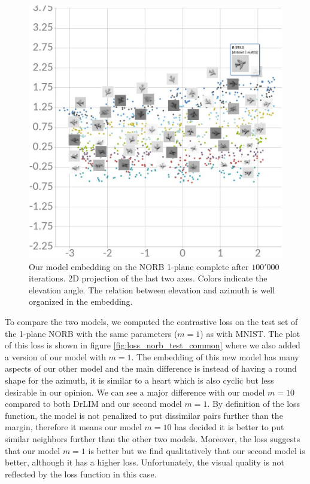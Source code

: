 \documentclass[a4paper,12pt]{report}
\begin{document}
\begin{figure}
    \centering
    \includegraphics[width=\textwidth]{thesis_figures/norb_cl2d2.jpg}
    \caption{Our model embedding on the NORB 1-plane complete after $100'000$ iterations.
    2D projection of the last two axes.
    Colors indicate the elevation angle.
    The relation between elevation and azimuth is well organized in the embedding.
    }
    \label{fig:norb_cl2d_embedding_2}
\end{figure}

To compare the two models, we computed the contrastive loss on the test set of the 1-plane NORB with the same parameters ($m=1$) as with MNIST.
The plot of this loss is shown in figure \ref{fig:loss_norb_test_common} where we also added a version of our model with $m=1$.
The embedding of this new model has many aspects of our other model and the main difference is instead of having a round shape for the azimuth, it is similar to a heart which is also cyclic but less desirable in our opinion.
We can see a major difference with our model $m=10$ compared to both DrLIM and our second model $m=1$.
By definition of the loss function, the model is not penalized to put dissimilar pairs further than the margin, therefore it means our model $m=10$ has decided it is better to put similar neighbors further than the other two models.
Moreover, the loss suggests that our model $m=1$ is better but we find qualitatively that our second model is better, although it has a higher loss.
Unfortunately, the visual quality is not reflected by the loss function in this case.
\end{document}
